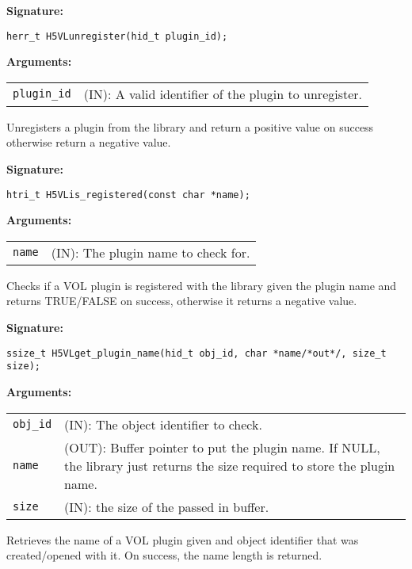 \begin{mdframed}[style=bgbox]
\textbf{Signature:}
\begin{lstlisting}
herr_t H5VLunregister(hid_t plugin_id);
\end{lstlisting}
\textbf{Arguments:}\\
\begin{tabular}{l p{10cm}}
  {\tt plugin\_id} & (IN): A valid identifier of the plugin to unregister.\\
\end{tabular}
\end{mdframed}
Unregisters a plugin from the library and return a positive value on success otherwise return a negative value.\bigskip


\begin{mdframed}[style=bgbox]
\textbf{Signature:}
\begin{lstlisting}
htri_t H5VLis_registered(const char *name);
\end{lstlisting}
\textbf{Arguments:}\\
\begin{tabular}{l p{10cm}}
  {\tt name} & (IN): The plugin name to check for.\\
\end{tabular}
\end{mdframed}
Checks if a VOL plugin is registered with the library given the plugin name and returns TRUE/FALSE on success, otherwise it returns a negative value.\bigskip


\begin{mdframed}[style=bgbox]
\textbf{Signature:}
\begin{lstlisting}
ssize_t H5VLget_plugin_name(hid_t obj_id, char *name/*out*/, size_t size);
\end{lstlisting}

\textbf{Arguments:}\\
\begin{tabular}{l p{10cm}}
  {\tt obj\_id} & (IN): The object identifier to check.\\
  {\tt name} & (OUT): Buffer pointer to put the plugin name. If NULL, the library just returns the size required to store the plugin name.\\
  {\tt size} & (IN): the size of the passed in buffer.\\
\end{tabular}
\end{mdframed}
Retrieves the name of a VOL plugin given and object identifier that was created/opened with it. On success, the name length is returned.\bigskip


